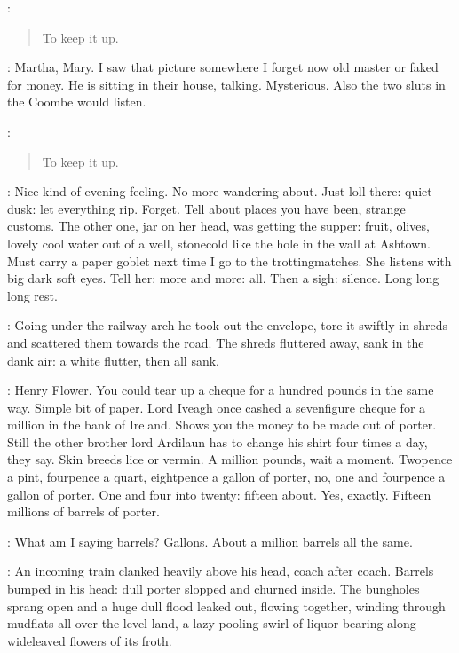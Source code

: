 \sluts:
\begin{verse}
    To keep it up.
\end{verse}

\BloomInt:
Martha, Mary.
I saw that picture somewhere I forget now
old master or faked for money.
He is sitting in their house, talking.
Mysterious.
Also the two sluts in the Coombe would listen.

\sluts:
\begin{verse}
    To keep it up.
\end{verse}

\BloomInt:
Nice kind of evening feeling.
No more wandering about.
Just loll there:
quiet dusk:
let everything rip.
Forget.
Tell about places you have been,
strange customs.
The other one,
jar on her head,
was getting the supper:
fruit, olives,
lovely cool water out of a well,
stonecold like the hole in the wall at Ashtown.
Must carry a paper goblet next time I go to the trottingmatches.
She listens with big dark soft eyes.
Tell her:
more and more:
all.
Then a sigh:
silence.
Long long long rest.

:
Going under the railway arch
he took out the envelope,
tore it swiftly in shreds
and scattered them towards the road.
The shreds fluttered away,
sank in the dank air:
a white flutter, then all sank.

\BloomInt:
Henry Flower.
You could tear up a cheque for a hundred pounds in the same way.
Simple bit of paper.
Lord Iveagh once cashed a sevenfigure cheque for a million in the bank of Ireland.
Shows you the money to be made out of porter.
Still the other brother
lord Ardilaun
has to change his shirt four times a day,
they say.
Skin breeds lice or vermin.
A million pounds, wait a moment.
Twopence a pint,
fourpence a quart,
eightpence a gallon of porter,
no, one and fourpence a gallon of porter.
One and four into twenty:
fifteen about.
Yes, exactly.
Fifteen millions of barrels of porter.

\BloomInt:
What am I saying barrels?
Gallons.
About a million barrels all the same.

:
An incoming train clanked heavily above his head, coach after coach.
Barrels bumped in his head:
dull porter slopped and churned inside.
The bungholes sprang open and a huge dull flood leaked out,
flowing together,
winding through mudflats all over the level land,
a lazy pooling swirl of liquor
bearing along wideleaved flowers of its froth.
